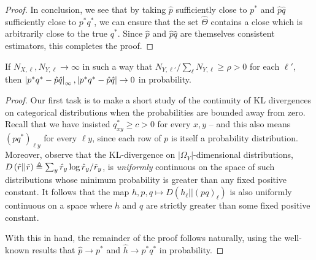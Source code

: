 \begin{proof}
In conclusion, we see that by taking $\hat p$ sufficiently close to $p^*$ and $\hat p \hat q$ sufficiently close to $p^*q^*$, we can ensure that the set $\hat \Theta$ contains a close which is arbitrarily close to the true $q^*$.  Since $\hat p$ and $\hat p \hat q$ are themselves consistent estimators, this completes the proof.
\end{proof}

\begin{lem}
\label{lem:easyconsistency} If $N_{X,\ell},N_{Y,\ell}\rightarrow \infty$ in such a way that $N_{Y,\ell'}/\sum_{\ell}N_{Y,\ell} \geq \rho>0$ for each $\ell'$, then $\left|p^*q^*-\hat p\hat q\right|_\infty,\left|p^*q^*-\hat p\hat q\right|\rightarrow 0$ in probability.
\end{lem}
\begin{proof}
Our first task is to make a short study of the continuity of KL divergences on categorical distributions when the probabilities are bounded away from zero.  Recall that we have insisted $q^*_{xy}\geq c>0$ for every $x,y$ -- and this also means $(pq^*)_{\ell y}$ for every $\ell y$, since each row of $p$ is itself a probability distribution.  Moreover, observe that the KL-divergence on $|\Omega_Y|$-dimensional distributions, $D\left(\hat r||\tilde r\right) \triangleq \sum_{y} \hat r_y \log \hat r_y / \tilde r_y$, is \emph{uniformly} continuous on the space of such distributions whose minimum probability is greater than any fixed positive constant.   It follows that the map $h,p,q \mapsto D(h_\ell||(pq)_\ell)$ is also uniformly continuous on a space where $h$ and $q$ are strictly greater than some fixed positive constant.   

With this in hand, the remainder of the proof follows naturally, using the well-known results that $\hat p \rightarrow p^*$ and $\hat h \rightarrow p^*q^*$ in probability.


\end{proof}
